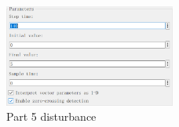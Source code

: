 \documentclass[11pt, a4paper]{article}
\begin{document}
\begin{figure}[htbp]     \begin{centering}
    \includegraphics[width=0.5\textwidth]{a5_3.png}
    \caption{Part 5 disturbance}
    \end{centering}
\end{figure}
\end{document}
